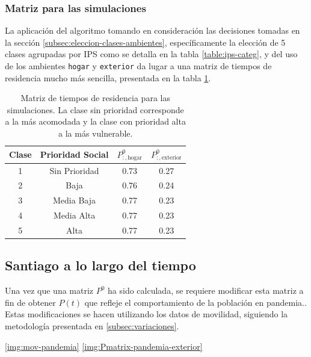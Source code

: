 \subsubsection*{Matriz para las simulaciones}\label{res:matrix-normal-simulaciones}

La aplicación del algoritmo tomando en consideración las decisiones tomadas en la sección \ref{subsec:eleccion-clases-ambientes}, específicamente la elección de 5 clases agrupadas por IPS como se detalla en la tabla \ref{table:ips-categ}, y del uso de los ambientes \texttt{hogar} y \texttt{exterior} da lugar a una matriz de tiempos de residencia mucho más sencilla, presentada en la tabla \ref{table:matrix-simulaciones}.

\begin{table}[h!]
\centering
\begin{tabular}{||c c | c c ||} 
 \hline
 \textbf{Clase} & \textbf{Prioridad Social} &  \(P^0_{:,\text{hogar}}\) & \(P^0_{:,\text{exterior}}\)\\[1ex] 
 \hline
 1 & Sin Prioridad  & 0.73  & 0.27 \\ 
 2 & Baja           & 0.76  & 0.24 \\
 3 & Media Baja     & 0.77  & 0.23 \\
 4 & Media Alta     & 0.77  & 0.23 \\
 5 & Alta           & 0.77  & 0.23 \\ 
 \hline
\end{tabular}
\caption[Matriz de tiempos de residencia para las simulaciones.]{Matriz de tiempos de residencia para las simulaciones. La clase sin prioridad corresponde a la más acomodada y la clase con prioridad alta a la más vulnerable.}
\label{table:matrix-simulaciones}
\end{table}

\subsection{Santiago a lo largo del tiempo} \label{res:matrix-pandemia}

Una vez que una matriz \(P^0\) ha sido calculada, se requiere modificar esta matriz a fin de obtener \(P(t)\) que refleje el comportamiento de la población en pandemia.. Estas modificaciones se hacen utilizando los datos de movilidad, siguiendo la metodología presentada en \ref{subsec:variaciones}.

\ref{img:mov-pandemia}
\ref{img:Pmatrix-pandemia-exterior}

